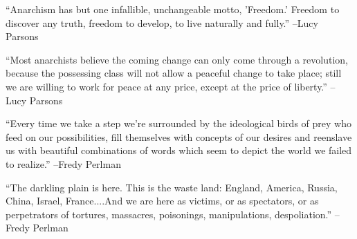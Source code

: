 \documentclass{article}%
\begin{document}
\begin{minipage}{\textwidth}%
\flushleft%
“Anarchism has but one infallible, unchangeable motto, 'Freedom.' Freedom to discover any truth, freedom to develop, to live naturally and fully.”%
\linebreak%
\vspace{1mm}%
–Lucy Parsons%
\linebreak%
\vspace{1mm}%
\end{minipage}%
\linebreak%
\vspace{1mm}%
\begin{minipage}{\textwidth}%
\flushleft%
“Most anarchists believe the coming change can only come through a revolution, because the possessing class will not allow a peaceful change to take place; still we are willing to work for peace at any price, except at the price of liberty.”%
\linebreak%
\vspace{1mm}%
–Lucy Parsons%
\linebreak%
\vspace{1mm}%
\end{minipage}%
\linebreak%
\vspace{1mm}%
\begin{minipage}{\textwidth}%
\flushleft%
“Every time we take a step we're surrounded by the ideological birds of prey who feed on our possibilities, fill themselves with concepts of our desires and reenslave us with beautiful combinations of words which seem to depict the world we failed to realize.”%
\linebreak%
\vspace{1mm}%
–Fredy Perlman%
\linebreak%
\vspace{1mm}%
\end{minipage}%
\linebreak%
\vspace{1mm}%
\begin{minipage}{\textwidth}%
\flushleft%
“The darkling plain is here. This is the waste land: England, America, Russia, China, Israel, France....And we are here as victims, or as spectators, or as perpetrators of tortures, massacres, poisonings, manipulations, despoliation.”%
\linebreak%
\vspace{1mm}%
–Fredy Perlman%
\linebreak%
\vspace{1mm}%
\end{minipage}%
\end{document}
